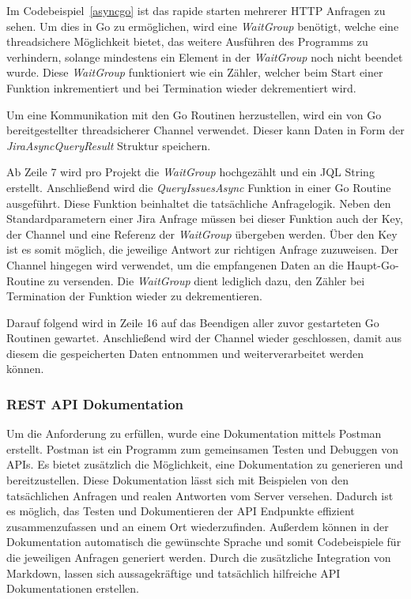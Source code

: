 Im Codebeispiel~\ref{asyncgo} ist das rapide starten mehrerer HTTP Anfragen zu sehen. Um dies in
Go zu ermöglichen, wird eine \textit{WaitGroup} benötigt, welche eine \gls{threadsicher}e
Möglichkeit bietet, das weitere Ausführen des Programms zu verhindern, solange mindestens
ein Element in der \textit{WaitGroup} noch nicht beendet wurde. Diese \textit{WaitGroup}
funktioniert wie ein Zähler, welcher beim Start einer Funktion inkrementiert und bei Termination
wieder dekrementiert wird. 

Um eine Kommunikation mit den Go Routinen herzustellen, wird ein von Go 
bereitgestellter \gls{threadsicher}er Channel verwendet. 
Dieser kann Daten in Form der \textit{JiraAsyncQueryResult} Struktur speichern. 

Ab Zeile 7 wird pro Projekt die \textit{WaitGroup} hochgezählt und ein \gls{JQL}
String erstellt. Anschließend wird die \textit{QueryIssuesAsync} Funktion in einer
Go Routine ausgeführt. Diese Funktion beinhaltet die tatsächliche Anfragelogik.
Neben den Standardparametern einer Jira Anfrage müssen bei dieser Funktion auch der Key,
der Channel und eine Referenz der \textit{WaitGroup} übergeben werden. Über den 
Key ist es somit möglich, die jeweilige Antwort zur richtigen Anfrage zuzuweisen.
Der Channel hingegen wird verwendet, um die empfangenen Daten an die Haupt-Go-Routine
zu versenden. Die \textit{WaitGroup} dient lediglich dazu, den Zähler bei Termination der Funktion
wieder zu dekrementieren.

Darauf folgend wird in Zeile 16 auf das Beendigen aller zuvor gestarteten Go 
Routinen gewartet. Anschließend wird der Channel wieder geschlossen, damit aus diesem
die gespeicherten Daten entnommen und weiterverarbeitet werden können.

\subsubsection{REST API Dokumentation}
Um die Anforderung  zu erfüllen, wurde eine Dokumentation
mittels Postman erstellt. Postman ist ein Programm
zum gemeinsamen Testen und Debuggen von APIs. Es bietet zusätzlich die Möglichkeit, eine Dokumentation
zu generieren und bereitzustellen. Diese Dokumentation lässt sich mit Beispielen von 
den tatsächlichen Anfragen und realen Antworten vom Server versehen.
Dadurch ist es möglich, das Testen und Dokumentieren
der API Endpunkte effizient zusammenzufassen und an einem Ort wiederzufinden. 
Außerdem können in der Dokumentation automatisch die gewünschte Sprache und somit 
Codebeispiele für die jeweiligen Anfragen generiert werden. 
Durch die zusätzliche Integration von \gls{Markdown}, 
lassen sich aussagekräftige und tatsächlich hilfreiche API Dokumentationen erstellen.

